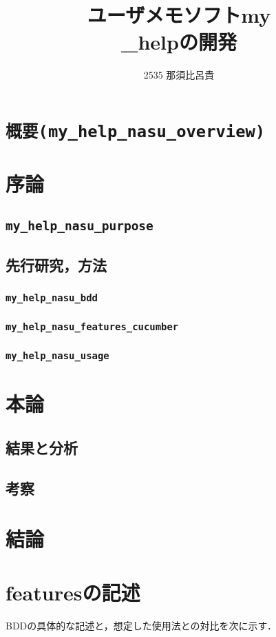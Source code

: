 \title{ユーザメモソフトmy\\_helpの開発}
\author{2535 那須比呂貴}
\date{}
\maketitle

\section{\verb|概要(my_help_nasu_overview)|}
\section{序論}
\subsection{\verb|my_help_nasu_purpose|}
\subsection{先行研究，方法}
\subsubsection{\verb|my_help_nasu_bdd|}
\subsubsection{\verb|my_help_nasu_features_cucumber|}
\subsubsection{\verb|my_help_nasu_usage|}
\section{本論}
\subsection{結果と分析}
\subsection{考察}
\section{結論}
\section{featuresの記述}
BDDの具体的な記述と，想定した使用法との対比を次に示す．

